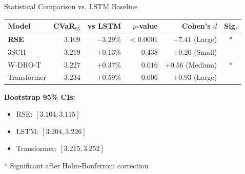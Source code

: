 \documentclass[aspectratio=169,11pt]{beamer}
\begin{document}
\begin{frame}{Statistical Comparison vs. LSTM Baseline}
\begin{table}
\centering
\begin{tabular}{lrrrrc}
\toprule
\textbf{Model} & \textbf{CVaR$_{95}$} & \textbf{vs LSTM} & \textbf{$p$-value} & \textbf{Cohen's $d$} & \textbf{Sig.} \\
\midrule
\textbf{RSE} & $3.109$ & $-3.29\%$ & $<0.0001$ & $-7.41$ (Large) & * \\
3SCH & $3.219$ & $+0.13\%$ & $0.438$ & $+0.20$ (Small) & \\
W-DRO-T & $3.227$ & $+0.37\%$ & $0.016$ & $+0.56$ (Medium) & * \\
Transformer & $3.234$ & $+0.59\%$ & $0.006$ & $+0.93$ (Large) & \\
\bottomrule
\end{tabular}
\end{table}

\vspace{0.3cm}
\textbf{Bootstrap 95\% CIs:}
\begin{itemize}
    \item RSE: $[3.104, 3.115]$
    \item LSTM: $[3.204, 3.226]$
    \item Transformer: $[3.215, 3.252]$
\end{itemize}

\small{* Significant after Holm-Bonferroni correction}
\end{frame}
\end{document}
